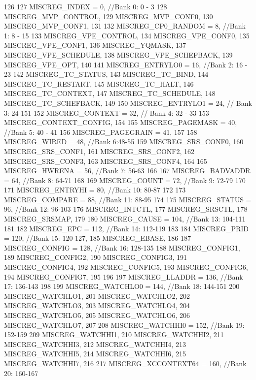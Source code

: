 \begin{DoxyCode}
126                  {
127     MISCREG_INDEX = 0,       //Bank 0: 0 - 3
128     MISCREG_MVP_CONTROL,
129     MISCREG_MVP_CONF0,
130     MISCREG_MVP_CONF1,
131 
132     MISCREG_CP0_RANDOM = 8,      //Bank 1: 8 - 15
133     MISCREG_VPE_CONTROL,
134     MISCREG_VPE_CONF0,
135     MISCREG_VPE_CONF1,
136     MISCREG_YQMASK,
137     MISCREG_VPE_SCHEDULE,
138     MISCREG_VPE_SCHEFBACK,
139     MISCREG_VPE_OPT,
140 
141     MISCREG_ENTRYLO0 = 16,   //Bank 2: 16 - 23
142     MISCREG_TC_STATUS,
143     MISCREG_TC_BIND,
144     MISCREG_TC_RESTART,
145     MISCREG_TC_HALT,
146     MISCREG_TC_CONTEXT,
147     MISCREG_TC_SCHEDULE,
148     MISCREG_TC_SCHEFBACK,
149 
150     MISCREG_ENTRYLO1 = 24,   // Bank 3: 24
151 
152     MISCREG_CONTEXT = 32,    // Bank 4: 32 - 33
153     MISCREG_CONTEXT_CONFIG,
154 
155     MISCREG_PAGEMASK = 40, //Bank 5: 40 - 41
156     MISCREG_PAGEGRAIN = 41,
157 
158     MISCREG_WIRED = 48,          //Bank 6:48-55
159     MISCREG_SRS_CONF0,
160     MISCREG_SRS_CONF1,
161     MISCREG_SRS_CONF2,
162     MISCREG_SRS_CONF3,
163     MISCREG_SRS_CONF4,
164 
165     MISCREG_HWRENA = 56,         //Bank 7: 56-63
166 
167     MISCREG_BADVADDR = 64,       //Bank 8: 64-71
168 
169     MISCREG_COUNT = 72,          //Bank 9: 72-79
170 
171     MISCREG_ENTRYHI = 80,        //Bank 10: 80-87
172 
173     MISCREG_COMPARE = 88,        //Bank 11: 88-95
174 
175     MISCREG_STATUS = 96,         //Bank 12: 96-103
176     MISCREG_INTCTL,
177     MISCREG_SRSCTL,
178     MISCREG_SRSMAP,
179 
180     MISCREG_CAUSE = 104,         //Bank 13: 104-111
181 
182     MISCREG_EPC = 112,           //Bank 14: 112-119
183 
184     MISCREG_PRID = 120,          //Bank 15: 120-127,
185     MISCREG_EBASE,
186 
187     MISCREG_CONFIG = 128,        //Bank 16: 128-135
188     MISCREG_CONFIG1,
189     MISCREG_CONFIG2,
190     MISCREG_CONFIG3,
191     MISCREG_CONFIG4,
192     MISCREG_CONFIG5,
193     MISCREG_CONFIG6,
194     MISCREG_CONFIG7,
195 
196 
197     MISCREG_LLADDR = 136,        //Bank 17: 136-143
198 
199     MISCREG_WATCHLO0 = 144,      //Bank 18: 144-151
200     MISCREG_WATCHLO1,
201     MISCREG_WATCHLO2,
202     MISCREG_WATCHLO3,
203     MISCREG_WATCHLO4,
204     MISCREG_WATCHLO5,
205     MISCREG_WATCHLO6,
206     MISCREG_WATCHLO7,
207 
208     MISCREG_WATCHHI0 = 152,     //Bank 19: 152-159
209     MISCREG_WATCHHI1,
210     MISCREG_WATCHHI2,
211     MISCREG_WATCHHI3,
212     MISCREG_WATCHHI4,
213     MISCREG_WATCHHI5,
214     MISCREG_WATCHHI6,
215     MISCREG_WATCHHI7,
216 
217     MISCREG_XCCONTEXT64 = 160, //Bank 20: 160-167
}
\end{DoxyCode}

